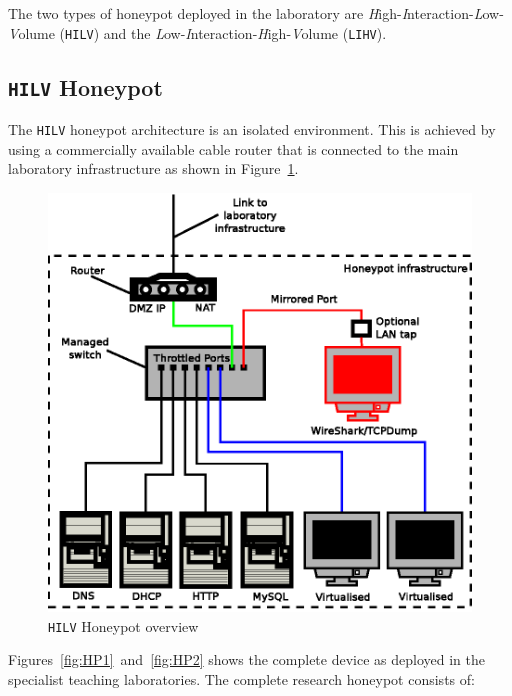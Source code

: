 The two types of honeypot deployed in the laboratory are
\emph{H}igh-\emph{I}nteraction-\emph{L}ow-\emph{V}olume (\texttt{HILV}) and the
\emph{L}ow-\emph{I}nteraction-\emph{H}igh-\emph{V}olume (\texttt{LIHV}).

\subsection{\texttt{HILV} Honeypot}

The \texttt{HILV} honeypot architecture is an isolated environment. This is
achieved by using a commercially available cable router that is connected to
the main laboratory infrastructure as shown in Figure~\ref{fig:HPOverview}.

\begin{figure}[!ht]
\begin{center}
	\includegraphics[scale=0.70]{Images/Honeypot1.eps}
\caption{\texttt{HILV} Honeypot overview}
\label{fig:HPOverview}
\end{center}
\end{figure}

Figures~\ref{fig:HP1}~and~\ref{fig:HP2} shows the complete device as deployed
in the specialist teaching laboratories. The complete research honeypot
consists of:

